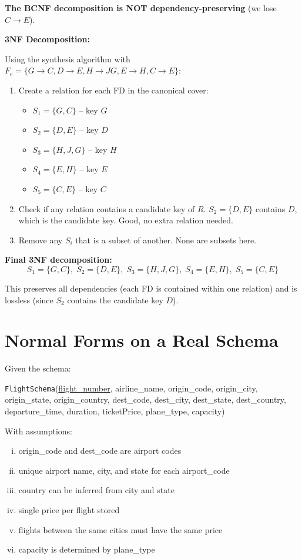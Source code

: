 \documentclass[11pt]{article}
\begin{document}
\textbf{The BCNF decomposition is NOT dependency-preserving} (we lose $C \to E$).

\medskip
\noindent\textbf{3NF Decomposition:}

Using the synthesis algorithm with $F_c = \{G \to C, D \to E, H \to JG, E \to H, C \to E\}$:

\begin{enumerate}
  \item Create a relation for each FD in the canonical cover:
  \begin{itemize}
    \item $S_1 = \{G, C\}$ -- key $G$
    \item $S_2 = \{D, E\}$ -- key $D$
    \item $S_3 = \{H, J, G\}$ -- key $H$
    \item $S_4 = \{E, H\}$ -- key $E$
    \item $S_5 = \{C, E\}$ -- key $C$
  \end{itemize}
  \item Check if any relation contains a candidate key of $R$. $S_2 = \{D, E\}$ contains $D$, which is the candidate key. Good, no extra relation needed.
  \item Remove any $S_i$ that is a subset of another. None are subsets here.
\end{enumerate}

\noindent\textbf{Final 3NF decomposition:}
\[
\boxed{S_1 = \{G, C\},\; S_2 = \{D, E\},\; S_3 = \{H, J, G\},\; S_4 = \{E, H\},\; S_5 = \{C, E\}}
\]

This preserves all dependencies (each FD is contained within one relation) and is lossless (since $S_2$ contains the candidate key $D$).

\section{Normal Forms on a Real Schema}

Given the schema:

\smallskip
\noindent\texttt{FlightSchema}(\underline{flight\_number}, airline\_name, origin\_code, origin\_city, origin\_state, origin\_country, dest\_code, dest\_city, dest\_state, dest\_country, departure\_time, duration, ticketPrice, plane\_type, capacity)

\smallskip
\noindent With assumptions:
\begin{enumerate}[(i)]
  \item origin\_code and dest\_code are airport codes
  \item unique airport name, city, and state for each airport\_code
  \item country can be inferred from city and state
  \item single price per flight stored
  \item flights between the same cities must have the same price
  \item capacity is determined by plane\_type
\end{enumerate}
\end{document}
